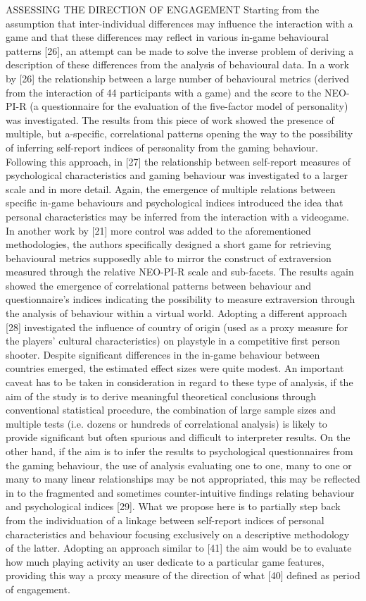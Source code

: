 ASSESSING THE DIRECTION OF ENGAGEMENT	
Starting from the assumption that inter-individual differences may influence the interaction with a game and that these differences may reflect in various in-game behavioural patterns [26], an attempt can be made to solve the inverse problem of deriving a description of these differences from the analysis of behavioural data. In a work by [26] the relationship between a large number of behavioural metrics (derived from the interaction of 44 participants with a game) and the score to the NEO-PI-R (a questionnaire for the evaluation of the five-factor model of personality) was investigated. The results from this piece of work showed the presence of multiple, but a-specific, correlational patterns opening the way to the possibility of inferring self-report indices of personality from the gaming behaviour. Following this approach, in [27] the relationship between self-report measures of psychological characteristics and gaming behaviour was investigated to a larger scale and in more detail. Again, the emergence of multiple relations between specific in-game behaviours and psychological indices introduced the idea that personal characteristics may be inferred from the interaction with a videogame. In another work by [21] more control was added to the aforementioned methodologies, the authors specifically designed a short game for retrieving behavioural metrics supposedly able to mirror the construct of extraversion measured through the relative NEO-PI-R scale and sub-facets. The results again showed the emergence of correlational patterns between behaviour and questionnaire’s indices indicating the possibility to measure extraversion through the analysis of behaviour within a virtual world. Adopting a different approach [28] investigated the influence of country of origin (used as a proxy measure for the players’ cultural characteristics) on playstyle in a competitive first person shooter. Despite significant differences in the in-game behaviour between countries emerged, the estimated effect sizes were quite modest. An important caveat has to be taken in consideration in regard to these type of analysis, if the aim of the study is to derive meaningful theoretical conclusions through conventional statistical procedure, the combination of large sample sizes and multiple tests (i.e. dozens or hundreds of correlational analysis) is likely to provide significant but often spurious and difficult to interpreter results. On the other hand, if the aim is to infer the results to psychological questionnaires from the gaming behaviour, the use of analysis evaluating one to one, many to one or many to many linear relationships may be not appropriated, this may be reflected in to the fragmented and sometimes counter-intuitive findings relating behaviour and psychological indices [29]. What we propose here is to partially step back from the individuation of a linkage between self-report indices of personal characteristics and behaviour focusing exclusively on a descriptive methodology of the latter. Adopting an approach similar to [41] the aim would be to evaluate how much playing activity an user dedicate to a particular game features, providing this way a proxy measure of the direction of what [40] defined as period of engagement.

